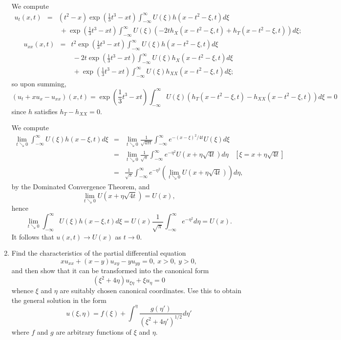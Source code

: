 \documentclass{article}
\begin{document}
\begin{enumerate}
We compute
\begin{eqnarray*}
u_t(x,t) & = & (t^2 - x) \exp \left( \frac{1}{3} t^3 - x t \right) \int_{-\infty}^{\infty} U(\xi) h(x - t^2 - \xi, t) d\xi \\
         &   & \ + \exp \left( \frac{1}{3} t^3 - x t \right) \int_{-\infty}^{\infty} U(\xi) \left( -2 t h_X(x - t^2 - \xi, t) + h_T(x - t^2 - \xi, t) \right) d\xi;
\end{eqnarray*}
\begin{eqnarray*}
u_{xx}(x,t) & = & t^2 \exp \left( \frac{1}{3} t^3 - x t \right) \int_{-\infty}^{\infty} U(\xi) h(x - t^2 - \xi, t) d\xi \\
            &   & \ - 2 t \exp \left( \frac{1}{3} t^3 - x t \right) \int_{-\infty}^{\infty} U(\xi) h_X(x - t^2 - \xi, t) d\xi \\
            &   & \ + \exp \left( \frac{1}{3} t^3 - x t \right) \int_{-\infty}^{\infty} U(\xi) h_{XX}(x - t^2 - \xi, t) d\xi;
\end{eqnarray*}
so upon summing,
\[(u_t + x u_x - u_{xx})(x,t) = \exp \left( \frac{1}{3} t^3 - x t \right) \int_{-\infty}^{\infty} U(\xi) \left( h_T(x - t^2 - \xi, t) - h_{XX}(x - t^2 - \xi, t) \right) d\xi = 0\]
since \(h\) satisfies \(h_T - h_{XX} = 0\).

We compute
\begin{eqnarray*}
\lim_{t \searrow 0} \int_{-\infty}^{\infty} U(\xi) h(x - \xi, t) d\xi
& = & \lim_{t \searrow 0} \frac{1}{\sqrt{4 \pi t}} \int_{-\infty}^{\infty} e^{-(x - \xi)^2 / 4 t} U(\xi) d\xi \\
& = & \lim_{t \searrow 0} \frac{1}{\sqrt{\pi}} \int_{-\infty}^{\infty} e^{-\eta^2} U \left( x + \eta \sqrt{4 t} \right) d\eta \ \ \ \ \left[ \xi = x + \eta \sqrt{4 t} \right] \\
& = & \frac{1}{\sqrt{\pi}} \int_{-\infty}^{\infty} e^{-\eta^2} \left( \lim_{t \searrow 0} U \left( x + \eta \sqrt{4 t} \right) \right) d\eta,
\end{eqnarray*}
by the Dominated Convergence Theorem, and
\[\lim_{t \searrow 0} U \left( x + \eta \sqrt{4 t} \right) = U(x),\]
hence
\[\lim_{t \searrow 0} \int_{-\infty}^{\infty} U(\xi) h(x - \xi, t) d\xi = U(x) \frac{1}{\sqrt{\pi}} \int_{-\infty}^{\infty} e^{-\eta^2} d\eta = U(x).\]
It follows that \(u(x,t) \to U(x)\) as \(t \to 0\).



\item Find the characteristics of the partial differential equation
\[x u_{xx} + (x - y) u_{xy} - y u_{yy} = 0, \ x > 0, \ y > 0,\]
and then show that it can be transformed into the canonical form
\[(\xi^2 + 4 \eta) u_{\xi\eta} + \xi u_{\eta} = 0\]
whence \(\xi\) and \(\eta\) are suitably chosen canonical coordinates.  Use this to obtain the general solution in the form
\[u(\xi,\eta) = f(\xi) + \int^\eta \frac{g(\eta')}{(\xi^2 + 4 \eta')^{1/2}} d\eta'\]
where \(f\) and \(g\) are arbitrary functions of \(\xi\) and \(\eta\).


\end{enumerate}
\end{document}
